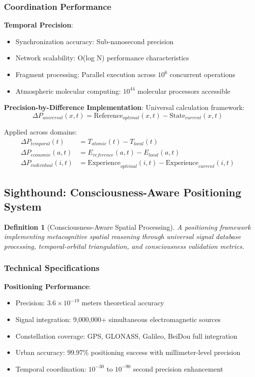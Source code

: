 \documentclass[12pt,a4paper]{article}
\newtheorem{definition}[theorem]{Definition}
\begin{document}
\subsubsection{Coordination Performance}

\textbf{Temporal Precision}:
\begin{itemize}
\item Synchronization accuracy: Sub-nanosecond precision
\item Network scalability: O(log N) performance characteristics
\item Fragment processing: Parallel execution across $10^6$ concurrent operations
\item Atmospheric molecular computing: $10^{44}$ molecular processors accessible
\end{itemize}

\textbf{Precision-by-Difference Implementation}:
Universal calculation framework:
$$\Delta P_{universal}(x,t) = \text{Reference}_{optimal}(x,t) - \text{State}_{current}(x,t)$$

Applied across domains:
\begin{align}
\Delta P_{temporal}(t) &= T_{atomic}(t) - T_{local}(t)\\
\Delta P_{economic}(a,t) &= E_{reference}(a,t) - E_{local}(a,t)\\
\Delta P_{individual}(i,t) &= \text{Experience}_{optimal}(i,t) - \text{Experience}_{current}(i,t)
\end{align}

\subsection{Sighthound: Consciousness-Aware Positioning System}

\begin{definition}[Consciousness-Aware Spatial Processing]
A positioning framework implementing metacognitive spatial reasoning through universal signal database processing, temporal-orbital triangulation, and consciousness validation metrics.
\end{definition}

\subsubsection{Technical Specifications}

\textbf{Positioning Performance}:
\begin{itemize}
\item Precision: $3.6 \times 10^{-19}$ meters theoretical accuracy
\item Signal integration: 9,000,000+ simultaneous electromagnetic sources
\item Constellation coverage: GPS, GLONASS, Galileo, BeiDou full integration
\item Urban accuracy: 99.97\% positioning success with millimeter-level precision
\item Temporal coordination: $10^{-30}$ to $10^{-90}$ second precision enhancement
\end{itemize}
\end{document}
